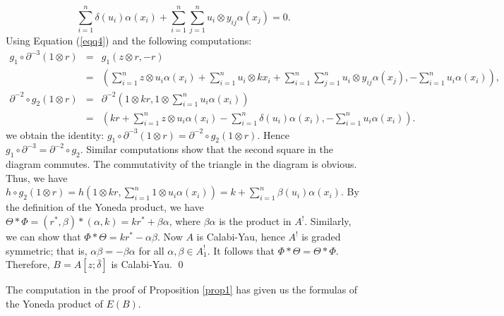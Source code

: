 \documentclass[a4paper]{amsart}
\begin{document}
 \begin{equation}\label{eqq4} \sum_{i=1}^n\delta(u_i)\alpha(x_i)+\sum_{i=1}^n\sum_{j=1}^nu_i{\otimes} y_{ij}\alpha(x_j)=0.
\end{equation}
Using Equation (\ref{eqq4}) and  the following computations:
{\small\begin{eqnarray}
 \nonumber g_1\circ\partial^{-3}(1{\otimes} r) &=& g_1(z{\otimes} r,-r) \\
 \nonumber  &=&\left( \sum_{i=1}^nz{\otimes} u_i\alpha(x_i)+\sum_{i=1}^nu_i{\otimes} k x_i+\sum_{i=1}^n\sum_{j=1}^nu_i{\otimes} y_{ij}\alpha(x_j),-\sum_{i=1}^n u_i\alpha(x_i)\right),
\end{eqnarray}
\begin{eqnarray}
  \nonumber \partial^{-2}\circ g_2(1{\otimes} r) &=& \partial^{-2} \left(1{\otimes} k r,1{\otimes}\sum_{i=1}^nu_i\alpha(x_i)\right) \\
  \nonumber &=& \left(k r+\sum_{i=1}^nz{\otimes} u_i\alpha(x_i)-\sum_{i=1}^n\delta(u_i)\alpha(x_i),-\sum_{i=1}^n u_i\alpha(x_i)\right).
\end{eqnarray}}
we obtain the identity: $g_1\circ\partial^{-3}(1{\otimes} r)=\partial^{-2}\circ g_2(1{\otimes} r)$. Hence $g_1\circ\partial^{-3}=\partial^{-2}\circ g_2$. Similar computations show that the second square in the diagram commutes. The commutativity of the triangle in the diagram is obvious.
Thus, we have $h\circ g_2(1{\otimes} r)=h(1{\otimes} k r, \sum_{i=1}^n1{\otimes} u_i\alpha(x_i))=k+\sum_{i=1}^n\beta(u_i)\alpha(x_i)$. By the definition of the Yoneda product,  we have $\Theta*\Phi=(r^*,\beta)*(\alpha,k)=kr^*+\beta\alpha$, where $\beta\alpha$ is the product in $A^!$. Similarly, we can show that $\Phi*\Theta=kr^*-\alpha\beta$. Now $A$ is Calabi-Yau, hence $A^!$ is graded symmetric; that is, $\alpha\beta=-\beta\alpha$ for all $\alpha,\beta\in A^!_1$. It follows that $\Phi*\Theta=\Theta*\Phi$. Therefore, $B=A[z;\bar{\delta}]$ is Calabi-Yau. \qed

The computation in the proof of Proposition \ref{prop1} has given us the formulas of the Yoneda product of $E(B)$.
\end{document}
